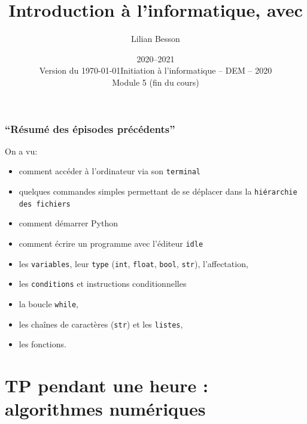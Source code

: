 \documentclass{beamer}
\title{Introduction à l'informatique, avec \pyth{}}
\author{Lilian Besson}
\date{2020--2021\\Version du \today}
\institute%
{
  ENS Rennes
  }
\date%
[Info -- DEM -- 2020]{Initiation à l'informatique -- DEM -- 2020\\Module 5 (fin du cours)}
\newcommand{\pyth}{{\sc Python}}
\newcommand{\prog}[1]{\alert{\texttt{#1}}}
\begin{document}
\frame{\titlepage}

\section[Outline]{}
\frame{\tableofcontents}
\frame
{
\frametitle{``Résumé des épisodes précédents''}
{
On a vu:
\begin{itemize}
  \item comment accéder à l'ordinateur via son \prog{terminal}
  \item quelques commandes simples permettant de se déplacer dans la \prog{hiérarchie des fichiers}
  \item comment démarrer \pyth{}
  \item comment écrire un programme avec l'éditeur \prog{idle}
  \item les \prog{variables}, leur \prog{type} (\prog{int}, \prog{float}, \prog{bool}, \prog{str}), l'affectation,
  \item les \prog{conditions} et instructions conditionnelles
  \item la boucle \prog{while},
  \item les chaînes de caractères (\prog{str}) et les \prog{listes},
  \item les fonctions.
\end{itemize}
}
}

\section{TP pendant une heure : algorithmes numériques}
\end{document}
